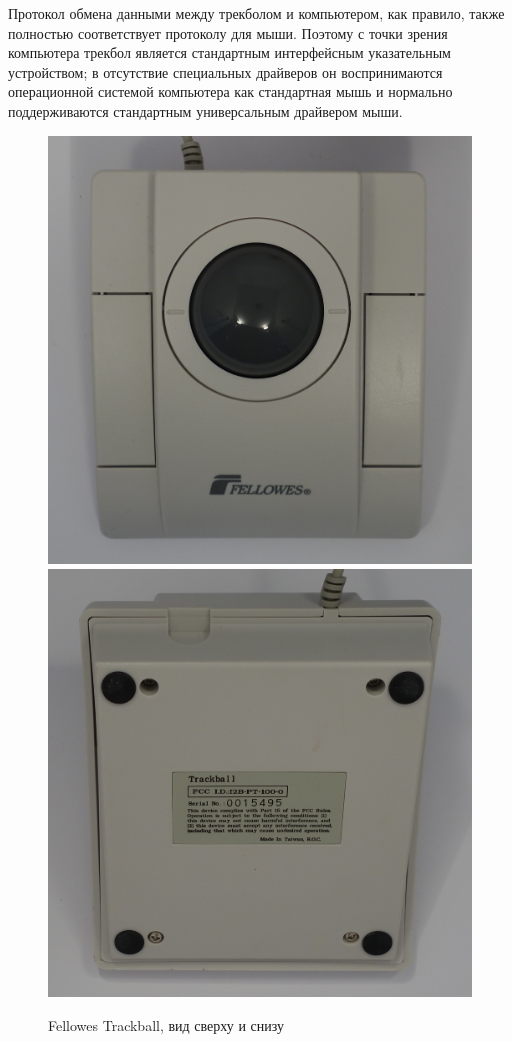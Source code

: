 \documentclass[11pt, a4paper]{article}
\begin{document}
Протокол обмена данными между трекболом и компьютером, как правило, также полностью соответствует протоколу для мыши. Поэтому с точки зрения компьютера трекбол является стандартным интерфейсным указательным устройством; в отсутствие специальных драйверов он воспринимаются операционной системой компьютера как стандартная мышь и нормально поддерживаются стандартным универсальным драйвером мыши. 

\begin{figure}[h]
    \centering
    \includegraphics[scale=0.3]{1997_fellowes_trackball/fellowsup.JPG}
    \includegraphics[scale=0.3]{1997_fellowes_trackball/fellowsdown.JPG}
    \caption{Fellowes Trackball, вид сверху и снизу}
    \label{fig:top}
\end{figure}
\end{document}
